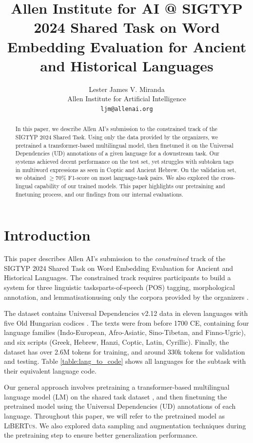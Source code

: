 \documentclass[11pt]{article}
\title{Allen Institute for AI @ SIGTYP 2024 Shared Task on Word Embedding Evaluation for Ancient and Historical Languages}
\author{Lester James V. Miranda \\
  Allen Institute for Artificial Intelligence \\
  \texttt{ljm@allenai.org} \\
}
\newcommand{\libertus}{\textsc{LiBERTus}}
\newcommand{\teamname}{Allen AI}
\begin{document}
\maketitle

\begin{abstract}
  In this paper, we describe \teamname{}'s submission to the constrained track of the SIGTYP 2024 Shared Task.
  Using only the data provided by the organizers, we pretrained a transformer-based multilingual model, then finetuned it on the Universal Dependencies (UD) annotations of a given language for a downstream task.
  Our systems achieved decent performance on the test set, yet struggles with subtoken tags in multiword expressions as seen in Coptic and Ancient Hebrew.
  On the validation set, we obtained $\geq$70\% F1-score on most language-task pairs.
  We also explored the cross-lingual capability of our trained models.
  This paper highlights our pretraining and finetuning process, and our findings from our internal evaluations.
\end{abstract}

\section{Introduction}
This paper describes \teamname{}'s submission to the \textit{constrained} track of the SIGTYP 2024 Shared Task on Word Embedding Evaluation for Ancient and Historical Languages.
The constrained track requires participants to build a system for three linguistic tasks\textemdash parts-of-speech (POS) tagging, morphological annotation, and lemmatisation\textemdash using only the corpora provided by the organizers \cite{dereza-etal-2024-findings}.



The dataset contains Universal Dependencies v2.12 data \cite{zeman-etal-2023-universal} in eleven languages with five Old Hungarian codices \cite{has-2018-hungarian}.
The texts were from before 1700 CE, containing four language families (Indo-European, Afro-Asiatic, Sino-Tibetan, and Finno-Ugric), and six scripts (Greek, Hebrew, Hanzi, Coptic, Latin, Cyrillic).
Finally, the dataset has over 2.6M tokens for training, and around 330k tokens for validation and testing.
Table \ref{table:lang_to_code} shows all languages for the subtask with their equivalent language code.

Our general approach involves pretraining a transformer-based multilingual language model (LM) on the shared task dataset \citep{dereza-etal-2024-findings}, and then finetuning the pretrained model using the Universal Dependencies (UD) annotations of each language.
Throughout this paper, we will refer to the pretrained model as \libertus{}.
We also explored data sampling and augmentation techniques during the pretraining step to ensure better generalization performance.
\end{document}
